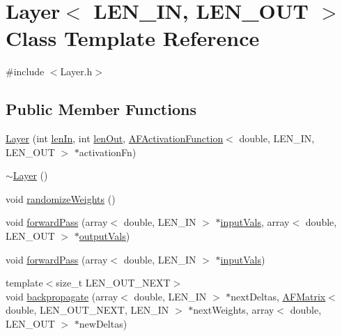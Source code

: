 \hypertarget{class_layer}{}\section{Layer$<$ L\+E\+N\+\_\+\+IN, L\+E\+N\+\_\+\+O\+UT $>$ Class Template Reference}
\label{class_layer}


{\ttfamily \#include $<$Layer.\+h$>$}

\subsection*{Public Member Functions}
\begin{DoxyCompactItemize}
\item 
\hyperlink{class_layer_a458cd765beb3e884d631d15e0e6cb690}{Layer} (int \hyperlink{class_layer_a844e22c542ae02cb475cabb8353300a8}{len\+In}, int \hyperlink{class_layer_ae10a61035ba7a18f9f2a6d1d3ebf9811}{len\+Out}, \hyperlink{class_a_f_activation_function}{A\+F\+Activation\+Function}$<$ double, L\+E\+N\+\_\+\+IN, L\+E\+N\+\_\+\+O\+UT $>$ $\ast$activation\+Fn)
\item 
\hyperlink{class_layer_a3ed1ecdffa6a2bb492aa282f029e85ae}{$\sim$\+Layer} ()
\item 
void \hyperlink{class_layer_aee349ae2e2c54fa8079cc564e84cb938}{randomize\+Weights} ()
\item 
void \hyperlink{class_layer_a5088f4edabd0de4d59f3c59cc8190786}{forward\+Pass} (array$<$ double, L\+E\+N\+\_\+\+IN $>$ $\ast$\hyperlink{class_layer_a38145ae44adb77f559a0ae77dad7c6f9}{input\+Vals}, array$<$ double, L\+E\+N\+\_\+\+O\+UT $>$ $\ast$\hyperlink{class_layer_a5007d0043790b288b9473ec233108482}{output\+Vals})
\item 
void \hyperlink{class_layer_a5f09327f0ab9f2d5b0d8fbe3e7994714}{forward\+Pass} (array$<$ double, L\+E\+N\+\_\+\+IN $>$ $\ast$\hyperlink{class_layer_a38145ae44adb77f559a0ae77dad7c6f9}{input\+Vals})
\item 
{\footnotesize template$<$size\+\_\+t L\+E\+N\+\_\+\+O\+U\+T\+\_\+\+N\+E\+XT$>$ }\\void \hyperlink{class_layer_a00f3e4879c6074dab5dd095b52791e88}{backpropagate} (array$<$ double, L\+E\+N\+\_\+\+IN $>$ $\ast$next\+Deltas, \hyperlink{class_a_f_matrix}{A\+F\+Matrix}$<$ double, L\+E\+N\+\_\+\+O\+U\+T\+\_\+\+N\+E\+XT, L\+E\+N\+\_\+\+IN $>$ $\ast$next\+Weights, array$<$ double, L\+E\+N\+\_\+\+O\+UT $>$ $\ast$new\+Deltas)
\item 

\end{DoxyCompactItemize}
